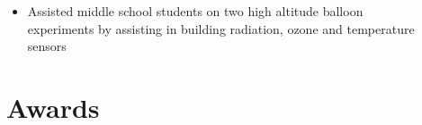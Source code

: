 \documentclass[margin]{res}
\begin{document}
\begin{resume}
\begin{itemize}
    \item[] Assisted middle school students on two high altitude balloon \\experiments by assisting in building radiation, ozone and temperature \\sensors
    \end{itemize}\vspace{-12pt}






\section{Awards}


\end{resume}
\end{document}
